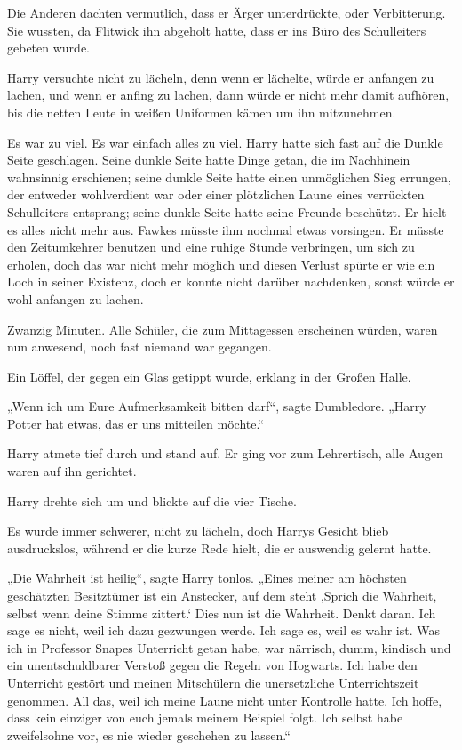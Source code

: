 {Die Anderen dachten vermutlich, dass er Ärger unterdrückte, oder Verbitterung. Sie wussten, da Flitwick ihn abgeholt hatte, dass er ins Büro des Schulleiters gebeten wurde.

Harry versuchte nicht zu lächeln, denn wenn er lächelte, würde er anfangen zu lachen, und wenn er anfing zu lachen, dann würde er nicht mehr damit aufhören, bis die netten Leute in weißen Uniformen kämen um ihn mitzunehmen.

Es war zu viel. Es war einfach alles zu viel. Harry hatte sich fast auf die Dunkle Seite geschlagen. Seine dunkle Seite hatte Dinge getan, die im Nachhinein wahnsinnig erschienen; seine dunkle Seite hatte einen unmöglichen Sieg errungen, der entweder wohlverdient war oder einer plötzlichen Laune eines verrückten Schulleiters entsprang; seine dunkle Seite hatte seine Freunde beschützt. Er hielt es alles nicht mehr aus. Fawkes müsste ihm nochmal etwas vorsingen. Er müsste den Zeitumkehrer benutzen und eine ruhige Stunde verbringen, um sich zu erholen, doch das war nicht mehr möglich und diesen Verlust spürte er wie ein Loch in seiner Existenz, doch er konnte nicht darüber nachdenken, sonst würde er wohl anfangen zu lachen.

Zwanzig Minuten. Alle Schüler, die zum Mittagessen erscheinen würden, waren nun anwesend, noch fast niemand war gegangen.

Ein Löffel, der gegen ein Glas getippt wurde, erklang in der Großen Halle.

„Wenn ich um Eure Aufmerksamkeit bitten darf“, sagte Dumbledore. „Harry Potter hat etwas, das er uns mitteilen möchte.“

Harry atmete tief durch und stand auf. Er ging vor zum Lehrertisch, alle Augen waren auf ihn gerichtet.

Harry drehte sich um und blickte auf die vier Tische.

Es wurde immer schwerer, nicht zu lächeln, doch Harrys Gesicht blieb ausdruckslos, während er die kurze Rede hielt, die er auswendig gelernt hatte.

„Die Wahrheit ist heilig“, sagte Harry tonlos. „Eines meiner am höchsten geschätzten Besitztümer ist ein Anstecker, auf dem steht ‚Sprich die Wahrheit, selbst wenn deine Stimme zittert.` Dies nun ist die Wahrheit. Denkt daran. Ich sage es nicht, weil ich dazu gezwungen werde. Ich sage es, weil es wahr ist. Was ich in Professor Snapes Unterricht getan habe, war närrisch, dumm, kindisch und ein unentschuldbarer Verstoß gegen die Regeln von Hogwarts. Ich habe den Unterricht gestört und meinen Mitschülern die unersetzliche Unterrichtszeit genommen. All das, weil ich meine Laune nicht unter Kontrolle hatte. Ich hoffe, dass kein einziger von euch jemals meinem Beispiel folgt. Ich selbst habe zweifelsohne vor, es nie wieder geschehen zu lassen.“

}
